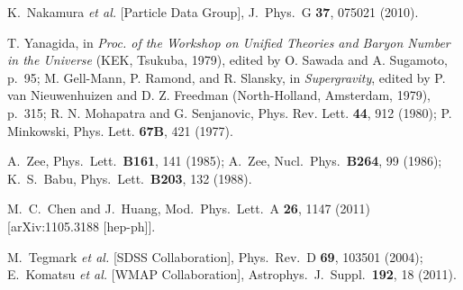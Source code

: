 \documentclass[aps,prd,preprint,nofootinbib]{revtex4}
\begin{document}
\begin{thebibliography}{99}
  K.~Nakamura {\it et al.}  [Particle Data Group],
  J.\ Phys.\ G {\bf 37}, 075021 (2010).

 T. Yanagida, in {\it Proc. of the Workshop on Unified
Theories and Baryon Number in the Universe} (KEK, Tsukuba, 1979), edited by
O. Sawada and A. Sugamoto, p.~95; M. Gell-Mann, P. Ramond, and R. Slansky,
in {\it Supergravity}, edited by P. van Nieuwenhuizen and D. Z. Freedman
(North-Holland, Amsterdam, 1979), p.~315; R. N. Mohapatra and G. Senjanovic,
Phys. Rev. Lett. {\bf 44}, 912 (1980); P. Minkowski, Phys. Lett. {\bf 67B},
421 (1977).


  A.~Zee,
  Phys.\ Lett.\  {\bf B161}, 141 (1985);
  A.~Zee,
  Nucl.\ Phys.\  {\bf B264}, 99 (1986);
  K.~S.~Babu,
  Phys.\ Lett.\  {\bf B203}, 132 (1988).

  M.~C.~Chen and J.~Huang,
  Mod.\ Phys.\ Lett.\  A {\bf 26}, 1147 (2011)
  [arXiv:1105.3188 [hep-ph]].

   M.~Tegmark {\it et al.}  [SDSS Collaboration],
  Phys.\ Rev.\  D {\bf 69}, 103501 (2004);
  E.~Komatsu {\it et al.}  [WMAP Collaboration],
  Astrophys.\ J.\ Suppl.\  {\bf 192}, 18 (2011).








\end{thebibliography}
\end{document}
